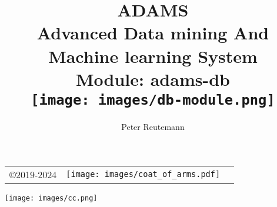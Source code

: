 \documentclass[a4paper]{book}
\title{
  \textbf{ADAMS} \\
  {\Large \textbf{A}dvanced \textbf{D}ata mining \textbf{A}nd \textbf{M}achine
  learning \textbf{S}ystem} \\
  {\Large Module: adams-db} \\
  \vspace{1cm}
  \texttt{[image: images/db-module.png]} \\
}
\author{
  Peter Reutemann
}
\begin{document}
\begin{titlepage}
\maketitle

\thispagestyle{empty}
\center
\begin{table}[b]
	\begin{tabular}{c l l}
		\parbox[c][2cm]{2cm}{\copyright 2019-2024} &
		\parbox[c][2cm]{5cm}{\texttt{[image: images/coat\_of\_arms.pdf]}} \\
	\end{tabular}
	\texttt{[image: images/cc.png]} \\
\end{table}

\end{titlepage}

\tableofcontents

\end{document}
